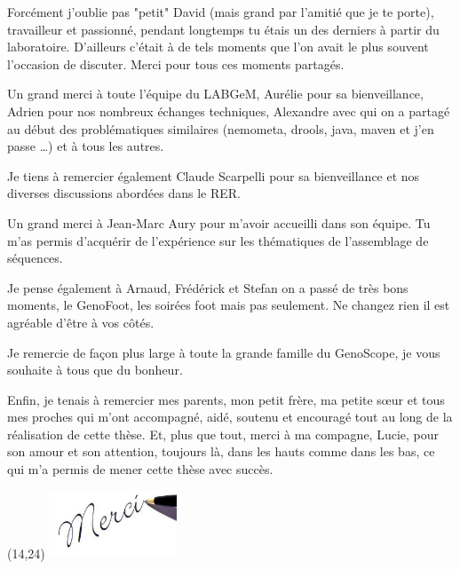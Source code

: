     Forcément j'oublie pas "petit" David (mais grand par l'amitié que je te porte), travailleur et passionné, pendant longtemps tu étais un des derniers à partir du laboratoire. D'ailleurs c'était à de tels moments que l'on avait le plus souvent l'occasion de discuter. Merci pour tous ces moments partagés.
    
    Un grand merci à toute l'équipe du LABGeM, Aurélie pour sa bienveillance, Adrien pour nos nombreux échanges techniques, Alexandre avec qui on a partagé au début des problématiques similaires (nemometa, drools, java, maven et j'en passe \ldots) et à tous les autres.
    
    Je tiens à remercier également Claude Scarpelli pour sa bienveillance et nos diverses discussions abordées dans le RER.
    
    Un grand merci à Jean-Marc Aury pour m'avoir accueilli dans son équipe. Tu m'as permis d'acquérir de l'expérience sur les thématiques de l'assemblage de séquences.
    
    Je pense également à Arnaud, Frédérick et Stefan on a passé de très bons moments, le GenoFoot, les soirées foot mais pas seulement. Ne changez rien il est agréable d'être à vos côtés.
    
    Je remercie de façon plus large à toute la grande famille du GenoScope, je vous souhaite à tous que du bonheur.
    
    Enfin, je tenais à remercier mes parents, mon petit frère, ma petite sœur et tous mes proches qui m'ont accompagné, aidé, soutenu et encouragé tout au long de la réalisation de cette thèse. Et, plus que tout, merci à ma compagne, Lucie, pour son amour et son attention, toujours là, dans les hauts comme dans les bas, ce qui m'a permis de mener cette thèse avec succès.

\begin{textblock}{3}(14,24)
    \includegraphics[height=2cm]{img/merci.jpg}
\end{textblock}

\normalFont
